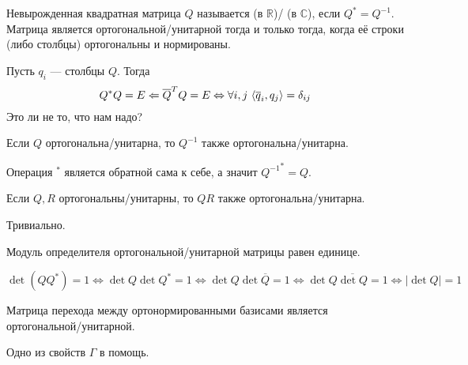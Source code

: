 \documentclass{article}
\begin{document}
\begin{itemize}
\begin{Comment}
        \end{Comment}
        \dfn Невырожденная квадратная матрица $Q$ называется  (в $\mathbb R$)/ (в $\mathbb C$), если $Q^*=Q^{-1}$.
        \thm Матрица является ортогональной/унитарной тогда и только тогда, когда её строки (либо столбцы) ортогональны и нормированы.
        \begin{Proof}
            Пусть $q_i$ --- столбцы $Q$. Тогда
            $$Q^*Q=E\Leftarrow\overline{Q}^TQ=E\Leftrightarrow\forall i,j~{\left\langle{\overline q_i},{q_j}\right\rangle}=\delta_{ij}$$
            Это ли не то, что нам надо?
        \end{Proof}
        \thm Если $Q$ ортогональна/унитарна, то $Q^{-1}$ также ортогональна/унитарна.
        \begin{Proof}
            Операция ${}^*$ является обратной сама к себе, а значит ${Q^{-1}}^*=Q$.
        \end{Proof}
        \thm Если $Q,R$ ортогональны/унитарны, то $QR$ также ортогональна/унитарна.
        \begin{Proof}
            Тривиально.
        \end{Proof}
        \thm Модуль определителя ортогональной/унитарной матрицы равен единице.
        \begin{Proof}
            $$
            \det(QQ^*)=1\Leftrightarrow\det Q\det Q^*=1\Leftrightarrow\det Q\det\overline{Q}=1\Leftrightarrow\det Q\overline{\det Q}=1\Leftrightarrow|\det Q|=1
            $$
        \end{Proof}
        \thm Матрица перехода между ортонормированными базисами является ортогональной/унитарной.
        \begin{Proof}
            Одно из свойств $\Gamma$ в помощь.
        \end{Proof}
    \end{itemize}
\end{document}
